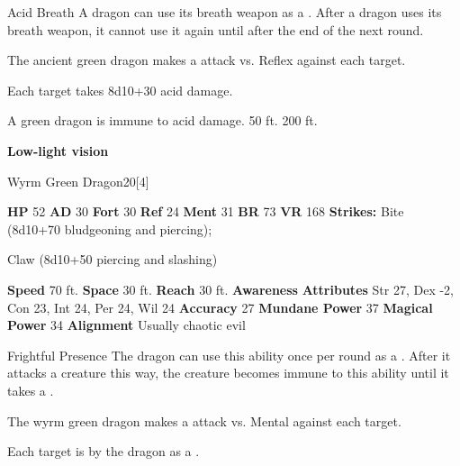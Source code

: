     \begin{freeability}{Acid Breath}
      A dragon can use its breath weapon as a .
      After a dragon uses its breath weapon, it cannot use it again until after the end of the next round.
      \par The ancient green dragon makes a  attack
        vs. Reflex against each target.
    
    \hit Each target takes 8d10+30 acid damage.
    \end{freeability}
  
      
       A green dragon is immune to acid damage.
     50 ft.
     200 ft.
    \par\noindent\textbf{Low-light vision}
  

  \begin{monsubsection}{Wyrm Green Dragon}{20}[4]
    \vspace{-1em}\vspace{-1em}
    \vspace{0em}

    
    

    \begin{spellcontent}
      \begin{spelltargetinginfo}
        \pari \textbf{HP} 52 \monsep
          \textbf{AD} 30 \monsep
          \textbf{Fort} 30 \monsep
          \textbf{Ref} 24 \monsep
          \textbf{Ment} 31
        \pari \textbf{BR} 73 \monsep
        \textbf{VR} 168
        \pari \textbf{Strikes:}
            Bite  (8d10+70 bludgeoning and piercing);
\par Claw  (8d10+50 piercing and slashing)
      \end{spelltargetinginfo}
    \end{spellcontent}
    \begin{monsterfooter}
      \pari \textbf{Speed} 70 ft. \monsep
        \textbf{Space} 30 ft. \monsep
        \textbf{Reach} 30 ft.
      \pari \textbf{Awareness} 
      \pari \textbf{Attributes}
        Str 27, Dex -2,
        Con 23, Int 24,
        Per 24, Wil 24
      \pari \textbf{Accuracy} 27 \monsep
        \textbf{Mundane Power} 37 \monsep
      \textbf{Magical Power} 34
      \pari \textbf{Alignment} Usually chaotic evil
    \end{monsterfooter}
  \end{monsubsection}
  \begin{freeability}{Frightful Presence}
      The dragon can use this ability once per round as a .
      After it attacks a creature this way, the creature becomes immune to this ability until it takes a .
      \par The wyrm green dragon makes a  attack
        vs. Mental against each target.
    
    \hit Each target is  by the dragon as a .
    \end{freeability}
  


